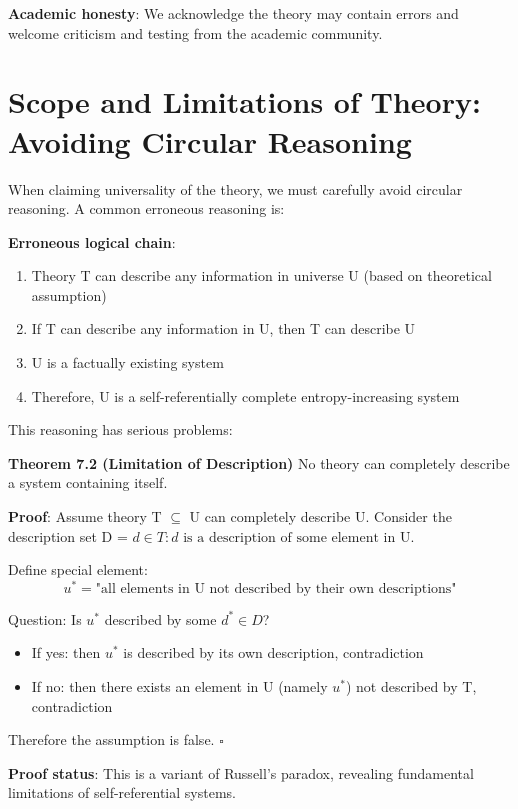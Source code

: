 \textbf{Academic honesty}:
We acknowledge the theory may contain errors and welcome criticism and testing from the academic community.

\section{Scope and Limitations of Theory: Avoiding Circular Reasoning}
\label{sec:ch07_defense:scope-and-limitations-of-theory-avoiding-circular-reasoning}

When claiming universality of the theory, we must carefully avoid circular reasoning. A common erroneous reasoning is:

\textbf{Erroneous logical chain}:
\begin{enumerate}
\item Theory T can describe any information in universe U (based on theoretical assumption)
\item If T can describe any information in U, then T can describe U
\item U is a factually existing system
\item Therefore, U is a self-referentially complete entropy-increasing system
\end{enumerate}

This reasoning has serious problems:

\textbf{Theorem 7.2 (Limitation of Description)}
\label{thm:7.2}
No theory can completely describe a system containing itself.

\textbf{Proof}:
Assume theory T $\subseteq$ U can completely describe U.
Consider the description set D = ${d \in T : d\text{ is a description of some element in U}}$.

Define special element:
\begin{equation}
u^* = \text{"all elements in U not described by their own descriptions"}
\end{equation}

Question: Is $u^*$ described by some $d^* \in D$?
\begin{itemize}
\item If yes: then $u^*$ is described by its own description, contradiction
\item If no: then there exists an element in U (namely $u^*$) not described by T, contradiction
\end{itemize}

Therefore the assumption is false. $\square$

\textbf{Proof status}: This is a variant of Russell's paradox, revealing fundamental limitations of self-referential systems.

